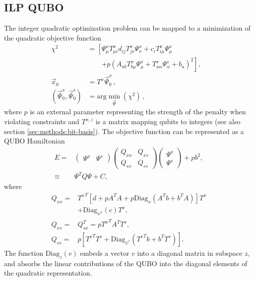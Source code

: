 \documentclass[prd,twocolumn,tightenlines,preprintnumbers,showpacs,superscriptaddress,notitlepage,nofootinbib,eqsecnum,floatfix,longbibliography,aps,10pt]{revtex4-2}
\begin{document}
\subsection{ILP QUBO}
\label{sec:results:qa}

The integer quadratic optimization problem can be mapped to a minimization of the quadratic objective function
\begin{align}
 \chi^2                         & = \left[\Psi^x_{\mu} T^x_{\mu i}d_{ij} T^x_{j \nu}\Psi^x_\nu + c_i T^x_{i\mu} \Psi^x_\mu \right.
 \nonumber                                                                                                                             \\ \label{eq:qubo-min}
                                & \qquad\left.+ p (A_{a b} T^x_{b \mu} \Psi^x_{\mu} + T^s_{a \alpha} \Psi^s_\alpha + b_a)^2 \right],   \\
 \vec x_0                       & =  T^x \vec \Psi^x_0 \, ,
 \\
 (\vec \Psi^x_0, \vec \Psi^s_0) & = \mathrm{arg}\min\limits_{\vec{\Psi}}(\chi^2) \,,                                                 &
\end{align}
where $p$ is an external parameter representing the strength of the penalty when violating constraints and $T^{x,z}$ is a matrix mapping qubits to integers (see also section \ref{sec:methods:bit-basis}).
The objective function can be represented as a QUBO Hamiltonian
\begin{align}
 E =    &
 \begin{pmatrix}
  \Psi^x & \Psi^s
 \end{pmatrix}
 \begin{pmatrix}
  Q_{xx} & Q_{xs} \\
  Q_{sx} & Q_{ss}
 \end{pmatrix}
 \begin{pmatrix}
  \Psi^x \\ \Psi^s
 \end{pmatrix} + pb^2, \\
 \equiv & \Psi^T Q \Psi + C,
 \label{eq:matrix_form}
\end{align}
where
\begin{align}
 Q_{xx} = & {T^{x}}^T \left[ d + p A^T A + p \mathrm{Diag}_{x} \left(A^T b + b^T A\right) \right] T^x \nonumber \\
          & + \mathrm{Diag}_{\psi^x}(c) T^x,                                                                    \\
 Q_{xs} = & Q_{sx}^T = p {T^{x}}^T A^T T^s,                                                                     \\
 Q_{ss} = & p\left[ {T^{s}}^T T^s + \mathrm{Diag}_{\psi^s}\left( {T^{s}}^T b + b^T T^s\right) \right].
\end{align}
The function $\mathrm{Diag}_{z}(v)$ embeds a vector $v$ into a diagonal matrix in subspace $z$, and absorbs the linear contributions of the QUBO into the diagonal elements of the quadratic representation.
\end{document}

